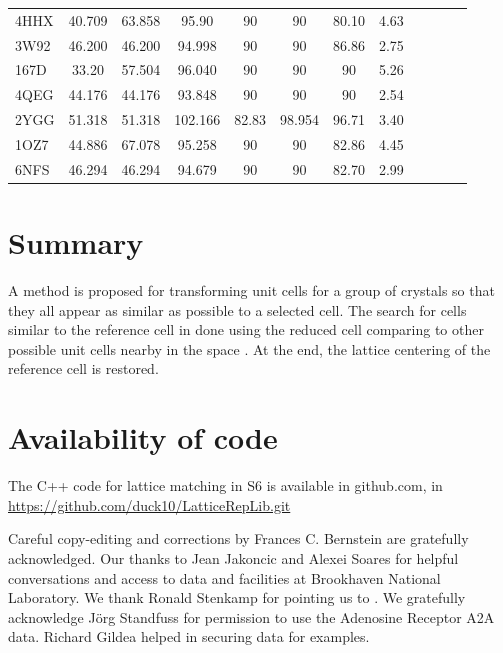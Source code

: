 \documentclass[preprint]{iucr}              %
\numberwithin{equation}{section}
\numberwithin{equation}{section}
\begin{document}
\begin{table}
\begin{center}
\begin{tabular}{lccccccccccc}
4HHX & 40.709 & 63.858 & 95.90 & 90 & 90 & 80.10 & 4.63 \\
3W92 & 46.200 & 46.200 & 94.998 & 90 & 90 & 86.86 & 2.75 \\
167D & 33.20 & 57.504 & 96.040 & 90 & 90 & 90 & 5.26 \\
4QEG & 44.176 & 44.176 & 93.848 & 90 & 90 & 90 & 2.54 \\
2YGG & 51.318 & 51.318 & 102.166 & 82.83 & 98.954 & 96.71 & 3.40  \\
1OZ7 & 44.886 & 67.078 & 95.258 & 90 & 90 & 82.86 & 4.45 \\
6NFS & 46.294 & 46.294 & 94.679 & 90 & 90 & 82.70 & 2.99 \\
				\bottomrule
			\end{tabular}
			\label{tablePDB2}
		\end{center}
	\end{table}	
	
	
	
	\section{Summary}
	
	A method is proposed for transforming unit cells for a group of crystals so that they all appear
	as similar as possible to a selected cell. The search for
	cells similar to the reference cell
	 in done using the reduced cell comparing to 
	other possible unit cells nearby in the space \SVI{}. 
	At the end, the lattice centering of the reference cell
	is restored.
	
	\section{Availability of code}
	
	The C++ code for lattice matching in S6 is available in github.com, in\\
	\url{https://github.com/duck10/LatticeRepLib.git}
	
	
	
	
	Careful copy-editing and corrections by Frances C. Bernstein are 
	gratefully acknowledged. Our thanks to Jean Jakoncic and Alexei Soares for 
	helpful conversations and access to data and facilities at 
	Brookhaven National Laboratory. We thank Ronald Stenkamp for pointing
	us to . We gratefully acknowledge
	Jörg Standfuss for permission to use the Adenosine Receptor A2A data.
	Richard Gildea helped in securing data for examples.
		
\end{document}
